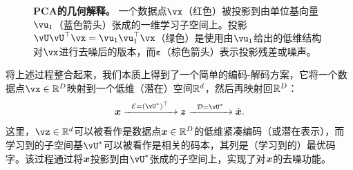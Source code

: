 \documentclass[../../book-main.tex]{subfiles}
\begin{document}
\begin{figure}
    \centering
    \caption{\small \textbf{PCA的几何解释。} 一个数据点$\vx$（红色）被投影到由单位基向量$\vu_1$（蓝色箭头）张成的一维学习子空间上。投影$\vU\vU^\top\vx = \vu_{1}\vu_{1}^{\top}\vx$（绿色）是使用由$\vu_{1}$给出的低维结构对$\vx$进行去噪后的版本，而$\boldsymbol{\varepsilon}$（棕色箭头）表示投影残差或噪声。}
    \label{fig:pca-geometry}
\end{figure}

将上述过程整合起来，我们本质上得到了一个简单的编码-解码方案，它将一个数据点$\vx \in \R^D$映射到一个低维（潜在）空间$\mathbb{R}^d$，然后再映射回$\mathbb{R}^D$：
\begin{equation}
\x \xrightarrow{\hspace{2mm} \mathcal{E} = (\vU^\ast)^\top \hspace{2mm}}  \z \xrightarrow{\hspace{2mm} \mathcal{D} = \vU^\ast \hspace{2mm}}   \hat{\x}.  
\label{eqn:autoencoding-PCA}
\end{equation}
这里，$\vz \in \R^d$可以被看作是数据点$\bm{x} \in \mathbb{R}^D$的低维紧凑编码（或潜在表示），而学习到的子空间基$\vU^\ast$可以被看作是相关的码本，其列是（学习到的）最优码字。该过程通过将$\bm{x}$投影到由$\vU^\ast$张成的子空间上，实现了对$\bm{x}$的去噪功能。
\end{document}

